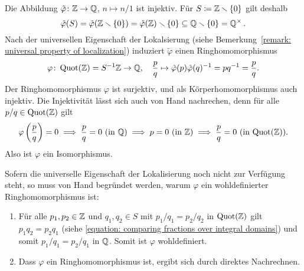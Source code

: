 \subsection{}

Die Abbildung $\tilde{\varphi} \colon \mathbb{Z} \to \mathbb{Q}$, $n \mapsto n/1$ ist injektiv.
Für $S \coloneqq \mathbb{Z} \smallsetminus \{0\}$ gilt deshalb
\[
            \tilde{\varphi}(S)
  =         \tilde{\varphi}(\mathbb{Z} \smallsetminus \{0\})
  =         \tilde{\varphi}(\mathbb{Z}) \smallsetminus \{0\}
  \subseteq \mathbb{Q} \smallsetminus \{0\}
  =         \mathbb{Q}^\times \,.
\]
Nach der universellen Eigenschaft der Lokalsierung (siehe Bemerkung~\ref{remark: universal property of localization}) induziert $\tilde{\varphi}$ einen Ringhomomorphismus
\[
          \varphi
  \colon  \operatorname{Quot}(\mathbb{Z})
  =       S^{-1} \mathbb{Z}
  \to     \mathbb{Q},
  \quad   \frac{p}{q}
  \mapsto \tilde{\varphi}(p) \tilde{\varphi}(q)^{-1}
  =       p q^{-1}
  =       \frac{p}{q}.
\]
Der Ringhomomorphismus $\varphi$ ist surjektiv, und als Körperhomomorphismus auch injektiv.
Die Injektivität lässt sich auch von Hand nachrechen, denn für alle $p/q \in \operatorname{Quot}(\mathbb{Z})$ gilt
\[
    \varphi\left( \frac{p}{q} \right) = 0
  \implies
    \text{$\frac{p}{q} = 0$ (in $\mathbb{Q}$)}
  \implies
    \text{$p = 0$ (in $\mathbb{Z}$)}
  \implies
    \text{$\frac{p}{q} = 0$ (in $\operatorname{Quot}(\mathbb{Z})$)}.
\]
Also ist $\varphi$ ein Isomorphismus.

\begin{remark}
  Sofern die universelle Eigenschaft der Lokalisierung noch nicht zur Verfügung steht, so muss von Hand begründet werden, warum $\varphi$ ein wohldefinierter Ringhomomorphismus ist:
  \begin{enumerate}
    \item
      Für alle $p_1, p_2 \in \mathbb{Z}$ und $q_1, q_2 \in S$ mit $p_1 / q_1 = p_2 / q_2$ in $\operatorname{Quot}(\mathbb{Z})$ gilt $p_1 q_2 = p_2 q_1$ (siehe \eqref{equation: comparing fractions over integral domains}) und somit $p_1 / q_1 = p_2 / q_1$ in $\mathbb{Q}$.
      Somit ist $\varphi$ wohldefiniert.
    \item
      Dass $\varphi$ ein Ringhomomorphismus ist, ergibt sich durch direktes Nachrechnen.
  \end{enumerate}
\end{remark}

